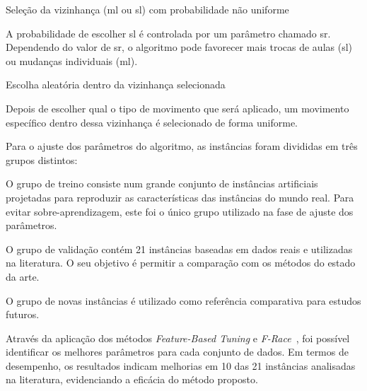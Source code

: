 \begin{compactitem}
    \item Seleção da vizinhança (\gls{ml} ou \gls{sl}) com probabilidade não uniforme
    
    A probabilidade de escolher \gls{sl} é controlada por um parâmetro chamado \gls{sr}. Dependendo do valor de \gls{sr}, o algoritmo pode favorecer mais trocas de aulas (\gls{sl}) ou mudanças individuais (\gls{ml}).

    \item Escolha aleatória dentro da vizinhança selecionada
    
    Depois de escolher qual o tipo de movimento que será aplicado, um movimento específico dentro dessa vizinhança é selecionado de forma uniforme.
\end{compactitem}

Para o ajuste dos parâmetros do algoritmo, as instâncias foram divididas em três grupos distintos:

\begin{compactenum}
    \item O grupo de treino consiste num grande conjunto de instâncias artificiais projetadas para reproduzir as características das instâncias do mundo real. Para evitar sobre-aprendizagem, este foi o único grupo utilizado na fase de ajuste dos parâmetros.
    
    \item O grupo de validação contém 21 instâncias baseadas em dados reais e utilizadas na literatura. O seu objetivo é permitir a comparação com os métodos do estado da arte.
    
    \item O grupo de novas instâncias é utilizado como referência comparativa para estudos futuros.
\end{compactenum}

Através da aplicação dos métodos \textit{Feature-Based Tuning} e \textit{F-Race}~\cite{FRaceIterated-Birattari-2010}, foi possível identificar os melhores parâmetros para cada conjunto de dados. Em termos de desempenho, os resultados indicam melhorias em 10 das 21 instâncias analisadas na literatura, evidenciando a eficácia do método proposto.



